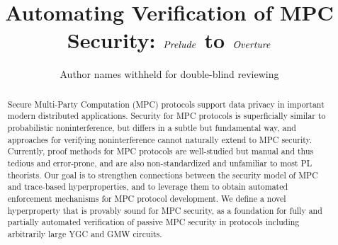 \documentclass[acmsmall,screen,review]{acmart}
\begin{document}
\title{Automating Verification of MPC Security: $\mathit{Prelude}$ to $\mathit{Overture}$}

\author{Author names withheld for double-blind reviewing}

\begin{abstract}
Secure Multi-Party Computation (MPC) protocols support data privacy in
important modern distributed applications. Security for MPC protocols
is superficially similar to probabilistic noninterference, but differs
in a subtle but fundamental way, and approaches for verifying
noninterference cannot naturally extend to MPC security.  Currently,
proof methods for MPC protocols are well-studied but manual
and thus tedious and error-prone, and are also non-standardized and
unfamiliar to most PL theorists.  Our goal is to strengthen
connections between the security model of MPC and trace-based
hyperproperties, and to leverage them to obtain automated
enforcement mechanisms for MPC protocol development.  We define a
novel hyperproperty that is provably sound for MPC security, as a
foundation for fully and partially automated verification of passive
MPC security in protocols including arbitrarily large YGC and GMW
circuits.
\end{abstract}

\maketitle















%




\appendix








\end{document}
